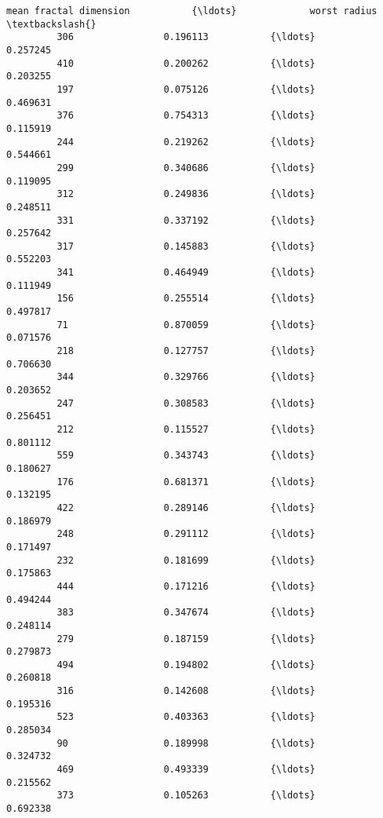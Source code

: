 \documentclass[11pt]{article}
\begin{document}
\begin{Verbatim}[commandchars=\\\{\}]
              mean fractal dimension           {\ldots}             worst radius  \textbackslash{}
         306                0.196113           {\ldots}                 0.257245   
         410                0.200262           {\ldots}                 0.203255   
         197                0.075126           {\ldots}                 0.469631   
         376                0.754313           {\ldots}                 0.115919   
         244                0.219262           {\ldots}                 0.544661   
         299                0.340686           {\ldots}                 0.119095   
         312                0.249836           {\ldots}                 0.248511   
         331                0.337192           {\ldots}                 0.257642   
         317                0.145883           {\ldots}                 0.552203   
         341                0.464949           {\ldots}                 0.111949   
         156                0.255514           {\ldots}                 0.497817   
         71                 0.870059           {\ldots}                 0.071576   
         218                0.127757           {\ldots}                 0.706630   
         344                0.329766           {\ldots}                 0.203652   
         247                0.308583           {\ldots}                 0.256451   
         212                0.115527           {\ldots}                 0.801112   
         559                0.343743           {\ldots}                 0.180627   
         176                0.681371           {\ldots}                 0.132195   
         422                0.289146           {\ldots}                 0.186979   
         248                0.291112           {\ldots}                 0.171497   
         232                0.181699           {\ldots}                 0.175863   
         444                0.171216           {\ldots}                 0.494244   
         383                0.347674           {\ldots}                 0.248114   
         279                0.187159           {\ldots}                 0.279873   
         494                0.194802           {\ldots}                 0.260818   
         316                0.142608           {\ldots}                 0.195316   
         523                0.403363           {\ldots}                 0.285034   
         90                 0.189998           {\ldots}                 0.324732   
         469                0.493339           {\ldots}                 0.215562   
         373                0.105263           {\ldots}                 0.692338   

\end{Verbatim}
\end{document}
